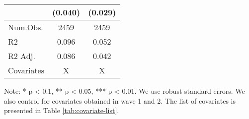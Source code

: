 \begin{table}
\begin{threeparttable}
\begin{tabular}[t]{lcc}
 & (\num{0.040}) & (\num{0.029})\\
\midrule
Num.Obs. & \num{2459} & \num{2459}\\
R2 & \num{0.096} & \num{0.052}\\
R2 Adj. & \num{0.086} & \num{0.042}\\
Covariates & X & X\\
\bottomrule
\end{tabular}
\begin{tablenotes}
\item Note: * p < 0.1, ** p < 0.05, *** p < 0.01. We use robust standard errors. We also control for covariates obtained in wave 1 and 2. The list of covariates is presented in Table \ref{tab:covariate-list}.
\end{tablenotes}
\end{threeparttable}
\end{table}
